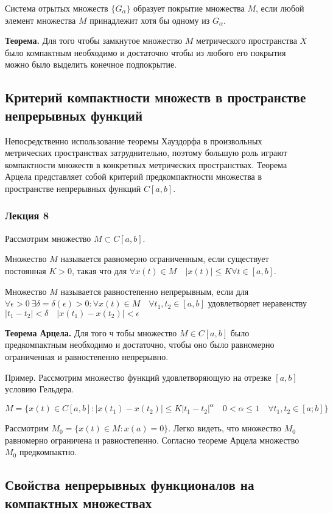 \documentclass[14pt]{extarticle}
\theoremstyle{definition}
\theoremstyle{remark}
\renewcommand{\[}{\begin{dmath*}[compact]}
\renewcommand{\]}{\end{dmath*}}
\newcommand{\tth}[1][]{\textbf{Теорема#1.}}
\begin{document}
Система отрытых множеств $\{G_\alpha\}$ образует покрытие множества $M$, если любой элемент множества $M$ принадлежит хотя бы одному из $G_\alpha$.

\tth[] Для того чтобы замкнутое множество $M$ метрического пространства $X$ было компактным необходимо и достаточно чтобы из любого его покрытия можно было выделить конечное подпокрытие.

\subsection{Критерий компактности множеств в пространстве непрерывных функций}

Непосредственно использование теоремы Хауздорфа в произвольных метрических пространствах затруднительно, поэтому большую роль играют компактности множеств в конкретных метрических пространствах. Теорема Арцела представляет собой критерий предкомпактности множества в пространстве непрерывных функций $C[a,b]$.

\subsubsection{Лекция 8}

Рассмотрим множество $M\subset C[a,b]$.

Множество $M$ называется равномерно ограниченным, если существует постоянная $K>0$, такая что для $\forall x(t)\in M \quad |x(t)|\leq K \forall t \in [a,b]$.

Множество $M$ называется равностепенно непрерывным, если для $\forall \epsilon > 0 \ \exists \delta = \delta(\epsilon)>0:\forall x(t)\in M\quad \forall t_1,t_2\in [a,b]$ удовлетворяет неравенству $|t_1-t_2|<\delta \quad |x(t_1)-x(t_2)|<\epsilon$

\tth[ Арцела] Для того ч тобы множество $M\in C[a,b]$ было предкомпактным необходимо и достаточно, чтобы оно было равномерно ограниченная и равностепенно непрерывно.

Пример. Рассмотрим множество функций удовлетворяющую на отрезке $[a,b]$ условию Гельдера.

\[
M=\{x(t)\in C[a,b]: |x(t_1)-x(t_2)|\leq K|t_1-t_2|^\alpha \quad 0 < \alpha \leq 1 \quad \forall t_1,t_2 \in [a;b]\}
\]

Рассмотрим $M_0=\{x(t)\in M:x(a)=0\}$. Легко видеть, что множество $M_0$ равномерно ограничена и равностепенно. Согласно теореме Арцела множество $M_0$ предкомпактно.

\subsection{Свойства непрерывных функционалов на компактных множествах}
\end{document}
